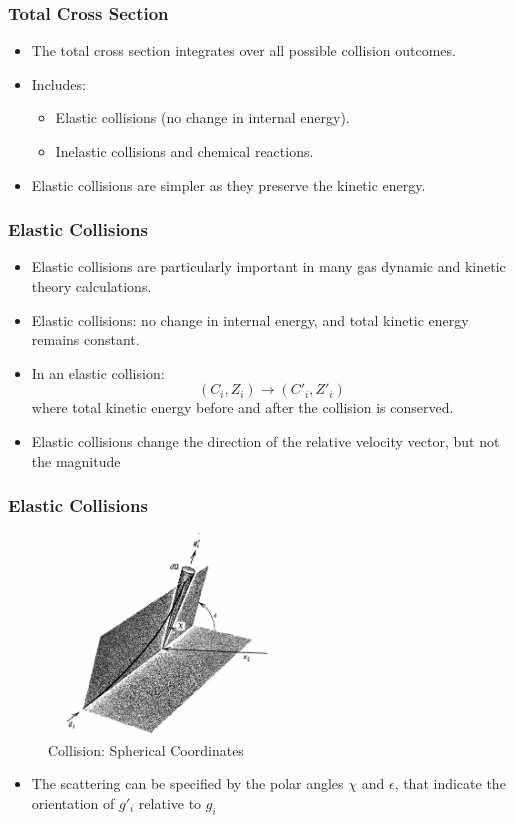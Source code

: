 \documentclass{beamer}
\begin{document}
\begin{frame}
\frametitle{Total Cross Section}
\begin{itemize}
    \item The total cross section integrates over all possible collision outcomes.
    \item Includes:
    \begin{itemize}
        \item Elastic collisions (no change in internal energy).
        \item Inelastic collisions and chemical reactions.
    \end{itemize}
    \item Elastic collisions are simpler as they preserve the kinetic energy.
\end{itemize}
\end{frame}

\begin{frame}
\frametitle{Elastic Collisions}
\begin{itemize}
    \item Elastic collisions are particularly important in many gas dynamic and kinetic theory calculations.
    \item Elastic collisions: no change in internal energy, and total kinetic energy remains constant.
    \item In an elastic collision:
    \[
    (C_i, Z_i) \longrightarrow (C'_i, Z'_i)
    \]
    where total kinetic energy before and after the collision is conserved.
    \item Elastic collisions change the direction of the relative velocity vector, but not the magnitude
\end{itemize}
\end{frame}

\begin{frame}
\frametitle{Elastic Collisions}
\begin{figure}
        \centering
        \includegraphics[width=0.55\textwidth]{collision_elastic.png}
        \caption{Collision: Spherical Coordinates}
    \end{figure}
\begin{itemize}
    \item The scattering can be specified by the polar angles $\chi$ and $\epsilon$, that indicate the orientation of $g'_i$ relative to  $g_i$
\end{itemize}
\end{frame}
\end{document}
